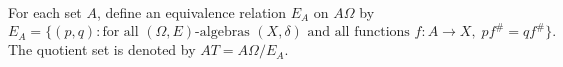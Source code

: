 For each set $A$, define an equivalence relation $E_A$ on $A\Omega$ by
$$
E_A = \{(p, q): \text{for all } (\Omega, E)\text{-algebras } (X, \delta) \text{ and all functions } f: A \longrightarrow X,\; pf^{\#} = qf^{\#}\}.
$$
The quotient set is denoted by $AT = A\Omega / E_A$.
